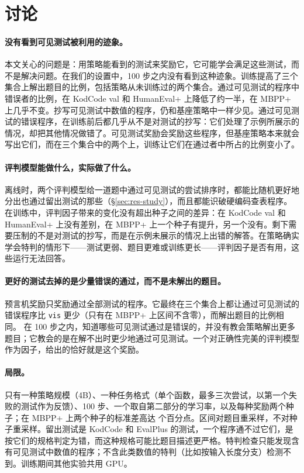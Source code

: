 
\section{讨论}\label{sec:discussion}

\paragraph{没有看到可见测试被利用的迹象。} 本文关心的问题是：用策略能看到的测试来奖励它，它可能学会满足这些测试，而不是解决问题。在我们的设置中，100 步之内没有看到这种迹象。训练提高了三个集合上解出题目的比例，包括策略从未训练过的两个集合。通过可见测试的程序中错误者的比例，在 KodCode val 和 HumanEval+ 上降低了约一半，在 MBPP+ 上几乎不变。抄写可见测试中数值的程序，仍和基座策略中一样少见。通过可见测试的错误程序，在训练前后都几乎从不是对测试的抄写：它们处理了示例所展示的情况，却把其他情况做错了。可见测试奖励会奖励这些程序，但基座策略本来就会写出它们，而在三个集合中的两个上，训练让它们在通过者中所占的比例变小了。

\paragraph{评判模型能做什么，实际做了什么。} 离线时，两个评判模型给一道题中通过可见测试的尝试排序时，都能比随机更好地分出也通过留出测试的那些（\S\ref{sec:res-study}），而且都能识破硬编码查表程序。在训练中，评判因子带来的变化没有超出种子之间的差异：在 KodCode val 和 HumanEval+ 上没有差别，在 MBPP+ 上一个种子有提升，另一个没有。剩下需要压制的不是对测试的抄写，而是在示例未展示的情况上出错的解答。在策略确实学会特判的情形下——测试更弱、题目更难或训练更长——评判因子是否有用，这些运行无法回答。

\paragraph{更好的测试去掉的是少量错误的通过，而不是未解出的题目。} 预言机奖励只奖励通过全部测试的程序。它最终在三个集合上都让通过可见测试的错误程序比 \texttt{vis} 更少（只有在 MBPP+ 上区间不含零），而解出题目的比例相同。
在 100 步之内，知道哪些可见测试通过是错误的，并没有教会策略解出更多题目；它教会的是在解不出时更少地通过可见测试。一个对正确性完美的评判模型作为因子，给出的恰好就是这个奖励。

\paragraph{局限。} 只有一种策略规模（4B）、一种任务格式（单个函数，最多三次尝试，以第一个失败的测试作为反馈）、100 步、一个取自第二部分的学习率，以及每种奖励两个种子；在 MBPP+ 上两个种子的标准差高达  个百分点。区间对题目重采样，不对种子重采样。留出测试是 KodCode 和 EvalPlus 的测试，一个程序通不过它们，是按它们的规格判定为错，而这种规格可能比题目描述更严格。特判检查只能发现含有可见测试中数值的程序；不含此类数值的特判（比如按输入长度分支）检测不到。训练期间其他实验共用 GPU。
